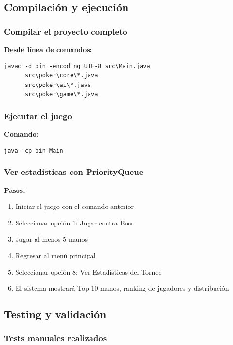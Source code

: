 \documentclass[12pt,a4paper]{article}
\begin{document}
\subsection{Compilación y ejecución}

\subsubsection{Compilar el proyecto completo}

\textbf{Desde línea de comandos:}
\begin{verbatim}
javac -d bin -encoding UTF-8 src\Main.java 
      src\poker\core\*.java 
      src\poker\ai\*.java 
      src\poker\game\*.java
\end{verbatim}

\subsubsection{Ejecutar el juego}

\textbf{Comando:}
\begin{verbatim}
java -cp bin Main
\end{verbatim}

\subsubsection{Ver estadísticas con PriorityQueue}

\textbf{Pasos:}
\begin{enumerate}
    \item Iniciar el juego con el comando anterior
    \item Seleccionar opción 1: Jugar contra Boss
    \item Jugar al menos 5 manos
    \item Regresar al menú principal
    \item Seleccionar opción 8: Ver Estadísticas del Torneo
    \item El sistema mostrará Top 10 manos, ranking de jugadores y distribución
\end{enumerate}

\subsection{Testing y validación}

\subsubsection{Tests manuales realizados}
\end{document}
